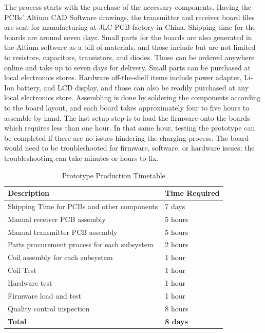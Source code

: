 \documentclass[12pt]{article}
\begin{document}
\indent \indent
The process starts with the purchase of the necessary components. Having the PCBs’ Altium CAD Software drawings, the transmitter and receiver board files are sent for manufacturing at JLC PCB factory in China. Shipping time for the boards are around seven days. Small parts for the boards are also generated in the Altium software as a bill of materials, and those include but are not limited to resistors, capacitors, transistors, and diodes. Those can be ordered anywhere online and take up to seven days for delivery. Small parts can be purchased at local electronics stores. Hardware off-the-shelf items include power adapter, Li-Ion battery, and LCD display, and those can also be readily purchased at any local electronics store. Assembling is done by soldering the components according to the board layout, and each board takes approximately four to five hours to assemble by hand. The last setup step is to load the firmware onto the boards which requires less than one hour. In that same hour, testing the prototype can be completed if there are no issues hindering the charging process. The board would need to be troubleshooted for firmware, software, or hardware issues; the troubleshooting can take minutes or hours to fix.  

\begin{table}[h!]
\centering
\caption{Prototype Production Timetable}
\begin{tabular}{ | l | l | }
\hline
\textbf{Description} & \textbf{Time Required}\\
\hline
Shipping Time for PCBs and other components & 7 days\\
\hline
Manual receiver PCB assembly & 5 hours\\
\hline
Manual transmitter PCB assembly & 5 hours\\
\hline
Parts procurement process for each subsystem & 2 hours\\
\hline
Coil assembly for each subsystem & 1 hour\\
\hline
Coil Test & 1 hour\\
\hline
Hardware test & 1 hour\\
\hline
Firmware load and test & 1 hour\\
\hline
Quality control inspection & 8 hours\\
\hline
\textbf{Total} & \textbf{8 days} \\
\hline
\end{tabular}
\end{table}

\hfill
\pagebreak
\hfill
\end{document}
